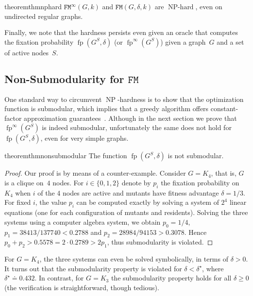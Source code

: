 \documentclass[letterpaper]{article}
\newcommand{\fp}{\operatorname{fp}}
\newcommand{\NodeActivationMoran}{\texttt{FM}}
\newcommand{\NodeActivationMoranStrong}{\texttt{FM}^{\infty}}
\newcommand{\FitAdv}{\delta}
\newcommand{\NP}{\operatorname{NP}}
\newcommand{\NPH}{\operatorname{NP-hard}}
\begin{document}
\begin{restatable}{theorem}{thmnphard}\label{thm:np_hard}
$\NodeActivationMoranStrong(G,k)$ and $\NodeActivationMoran(G,\FitAdv,k)$ are $\NPH$, even on undirected regular graphs.
\end{restatable}

Finally, we note that the hardness persists even given an oracle that computes the fixation probability $\fp(G^S,\FitAdv)$ (or $\fp^{\infty}(G^S)$) given a graph~$G$ and a set of active nodes~$S$.





\subsection{Non-Submodularity for $\NodeActivationMoran$}\label{subsec:non_submodularity}

One standard way to circumvent $\NP$-hardness is to show that the optimization function is submodular, which implies that a greedy algorithm offers constant-factor approximation guarantees~\cite{Nemhauser1978,Krause2014}. Although in the next section we prove that $\fp^\infty(G^S)$ is indeed submodular, unfortunately the same does not hold for $\fp(G^S, \FitAdv)$, even for very simple graphs.

\begin{restatable}{theorem}{thmnonsubmodular}\label{thm:non_submodular}
The function $\fp(G^S,\FitAdv)$ is not submodular.
\end{restatable}
\begin{proof}
Our proof is by means of a counter-example.
Consider $G=K_{4}$, that is, $G$ is a clique on~$4$ nodes.
For $i\in\{0,1,2\}$ denote by $p_i$ the fixation probability on $K_4$ when $i$ of the 4 nodes are active and mutants have fitness advantage $\FitAdv=1/3$.
For fixed $i$, the value $p_i$ can be computed exactly
by solving a system of $2^4$ linear equations (one for each configuration of mutants and residents).
Solving the three systems using a computer algebra system, we obtain $p_0=1/4$, $p_1=38413/137740<0.2788$ and $p_2=28984/94153>0.3078$.
Hence $p_0+p_2>0.5578=2\cdot 0.2789>2p_1$, thus submodularity is violated.
\end{proof}

For $G=K_4$, the three systems can even be solved symbolically, in terms of $\FitAdv>0$. It turns out that the submodularity property is violated for $\FitAdv<\delta^\star$, where $\delta^\star\doteq 0.432$. In contrast, for $G=K_3$ the submodularity property holds for all $\FitAdv\ge 0$ (the verification is straightforward, though tedious).
\end{document}
